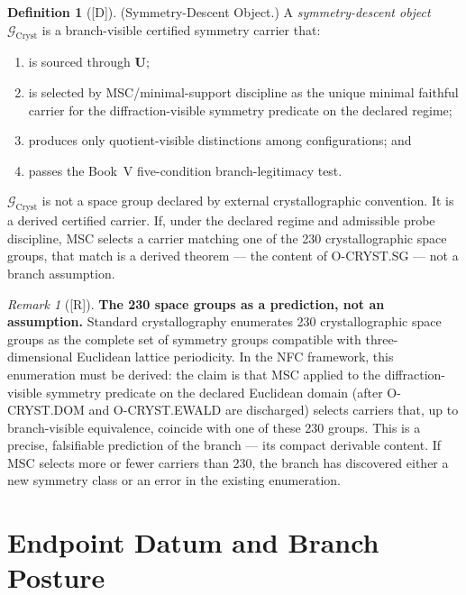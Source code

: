 \documentclass[12pt,oneside]{amsbook}
\theoremstyle{plain}
\theoremstyle{definition}
\newtheorem{definition}[theorem]{Definition}
\theoremstyle{remark}
\newtheorem{remark}[theorem]{Remark}
\newcommand{\status}[1]{\textup{[#1]}}
\begin{document}
\begin{definition}[\status{D}]\label{def:cryst-symmetry-descent}
\textup{(Symmetry-Descent Object.)}
A \emph{symmetry-descent object} $\mathcal{G}_{\mathrm{Cryst}}$ is
a branch-visible certified symmetry carrier that:
\begin{enumerate}[label=\textup{(\arabic*)}]
  \item is sourced through $\mathbf{U}$;
  \item is selected by MSC/minimal-support discipline as the unique
    minimal faithful carrier for the diffraction-visible symmetry
    predicate on the declared regime;
  \item produces only quotient-visible distinctions among
    configurations; and
  \item passes the Book~V five-condition branch-legitimacy test.
\end{enumerate}
$\mathcal{G}_{\mathrm{Cryst}}$ is not a space group declared by
external crystallographic convention.  It is a derived certified
carrier.  If, under the declared regime and admissible probe
discipline, MSC selects a carrier matching one of the 230
crystallographic space groups, that match is a derived theorem ---
the content of O-CRYST.SG --- not a branch assumption.
\end{definition}

\begin{remark}[\status{R}]\label{rem:cryst-230-note}
\textbf{The 230 space groups as a prediction, not an assumption.}
Standard crystallography enumerates 230 crystallographic space
groups as the complete set of symmetry groups compatible with
three-dimensional Euclidean lattice periodicity.  In the NFC
framework, this enumeration must be derived: the claim is that
MSC applied to the diffraction-visible symmetry predicate on the
declared Euclidean domain (after O-CRYST.DOM and O-CRYST.EWALD
are discharged) selects carriers that, up to branch-visible
equivalence, coincide with one of these 230 groups.  This is a
precise, falsifiable prediction of the branch --- its compact
derivable content.  If MSC selects more or fewer carriers than
230, the branch has discovered either a new symmetry class or an
error in the existing enumeration.
\end{remark}

\section{Endpoint Datum and Branch Posture}
\label{sec:cryst-endpoint}
\end{document}
